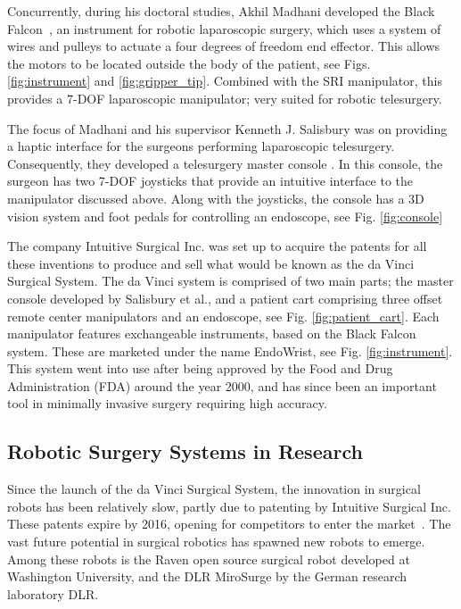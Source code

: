 \documentclass[a4paper, 10 pt, conference]{ieeeconf}      %
\begin{document}
Concurrently, during his doctoral studies, Akhil Madhani developed the Black Falcon~\cite{blackFalcon, madhani1997design, madhani1998articulated}, an instrument for robotic laparoscopic surgery, which uses a system of wires and pulleys to actuate a four degrees of freedom end effector.
This allows the motors to be located outside the body of the patient, see Figs. \ref{fig:instrument} and \ref{fig:gripper_tip}.
Combined with the SRI manipulator, this provides a 7-DOF laparoscopic manipulator; very suited for robotic telesurgery.

The focus of Madhani and his supervisor Kenneth J. Salisbury was on providing a haptic interface for the surgeons performing laparoscopic telesurgery.
Consequently, they developed a telesurgery master console \cite{salisbury2004master}.
In this console, the surgeon has two 7-DOF joysticks that provide an intuitive interface to the manipulator discussed above.
Along with the joysticks, the console has a 3D vision system and foot pedals for controlling an endoscope, see Fig. \ref{fig:console}

The company Intuitive Surgical Inc. was set up to acquire the patents for all these inventions to produce and sell what would be known as the da Vinci Surgical System.
The da Vinci system is comprised of two main parts; the master console developed by Salisbury et al., and a patient cart comprising three offset remote center manipulators and an endoscope, see Fig. \ref{fig:patient_cart}.
Each manipulator features exchangeable instruments, based on the Black Falcon system.
These are marketed under the name EndoWrist, see Fig. \ref{fig:instrument}.
This system went into use after being approved by the Food and Drug Administration (FDA) around the year 2000, and has since been an important tool in minimally invasive surgery requiring high accuracy.

\subsection{Robotic Surgery Systems in Research}
Since the launch of the da Vinci Surgical System, the innovation in surgical robots has been relatively slow, partly due to patenting by Intuitive Surgical Inc. These patents expire by 2016, opening for competitors to enter the market~\cite{intuitivePatents}.
The vast future potential in surgical robotics has spawned new robots to emerge. Among these robots is the Raven open source surgical robot \cite{ravenDesc} developed at Washington University, and the DLR MiroSurge by the German research laboratory DLR.
\end{document}
